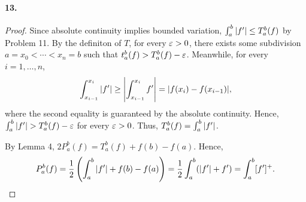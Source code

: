   \paragraph{13.}
  \begin{proof}
    Since absolute continuity implies bounded variation, $\int_a^b|f^\prime|\le 
    T_a^b(f)$ by Problem 11. By the definiton of $T$, for every $\varepsilon>0$, there
    exists some subdivision $a=x_0<\cdots<x_n=b$ such that $t_a^b(f)>T_a^b(f)-
    \varepsilon$. Meanwhile, for every $i=1,\dots,n$,
    \[
      \int_{x_{i-1}}^{x_i}|f^\prime| \ge 
      \left|\int_{x_{i-1}}^{x_i}f^\prime \right| =
      |f(x_i) - f(x_{i-1})|,
    \]
    where the second equality is guaranteed by the absolute continuity. Hence,
    $\int_a^b|f\hp|>T_a^b(f)-\vep$ for every $\varepsilon>0$. Thus, $T_a^b(f)=
    \int_a^b|f^\prime|$.\par
    By Lemma 4, $2P_a^b(f) = T_a^b(f) + f(b)-f(a)$. Hence,
    \[
      P_a^b(f) = \frac{1}{2}\left(\int_a^b|f^\prime| + f(b)-f(a)\right)
      =\frac{1}{2}\int_a^b (|f^\prime|+f^\prime) = \int_a^b[f^\prime]^+.
    \]
  \end{proof}

